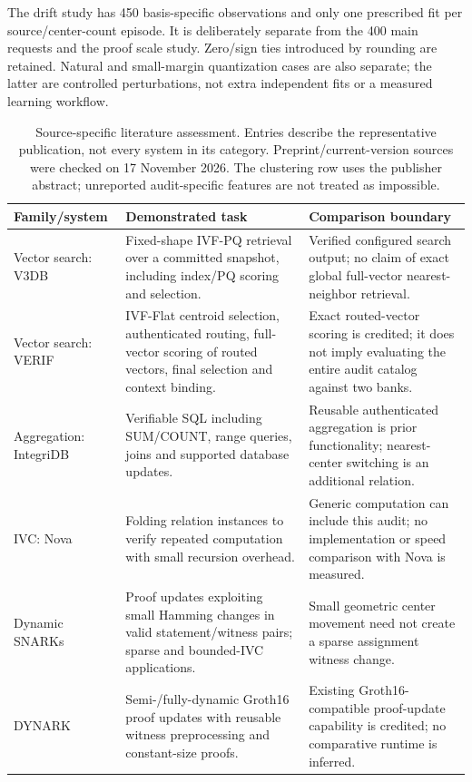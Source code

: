 \documentclass[5p,times,twocolumn]{elsarticle}
\begin{document}
The drift study has 450 basis-specific observations and only one prescribed
fit per source/center-count episode. It is deliberately separate from
the 400 main requests and the proof scale study. Zero/sign ties introduced
by rounding are retained. Natural and small-margin quantization cases
are also separate; the latter are controlled perturbations, not extra
independent fits or a measured learning workflow.


\begin{table}[H]
\centering\small
\caption{Source-specific literature assessment. Entries describe the representative publication, not every system in its category. Preprint/current-version sources were checked on 17 November 2026. The clustering row uses the publisher abstract; unreported audit-specific features are not treated as impossible.}
\label{tab:style-literature-tasks}
\begin{tabularx}{\textwidth}{@{}p{}XX@{}}\toprule
Family/system & Demonstrated task & Comparison boundary\\\midrule
Vector search: V3DB~\cite{v3db2026} & Fixed-shape IVF-PQ retrieval over a committed snapshot, including index/PQ scoring and selection. & Verified configured search output; no claim of exact global full-vector nearest-neighbor retrieval.\\
Vector search: VERIF~\cite{zhang2026verif} & IVF-Flat centroid selection, authenticated routing, full-vector scoring of routed vectors, final selection and context binding. & Exact routed-vector scoring is credited; it does not imply evaluating the entire audit catalog against two banks.\\
Aggregation: IntegriDB~\cite{zhang2015integridb} & Verifiable SQL including SUM/COUNT, range queries, joins and supported database updates. & Reusable authenticated aggregation is prior functionality; nearest-center switching is an additional relation.\\
IVC: Nova~\cite{kothapalli2022nova} & Folding relation instances to verify repeated computation with small recursion overhead. & Generic computation can include this audit; no implementation or speed comparison with Nova is measured.\\
Dynamic SNARKs~\cite{wang2024dynamic} & Proof updates exploiting small Hamming changes in valid statement/witness pairs; sparse and bounded-IVC applications. & Small geometric center movement need not create a sparse assignment witness change.\\
DYNARK~\cite{zhang2026dynark} & Semi-/fully-dynamic Groth16 proof updates with reusable witness preprocessing and constant-size proofs. & Existing Groth16-compatible proof-update capability is credited; no comparative runtime is inferred.\\

\end{tabularx}
\end{table}
\end{document}

